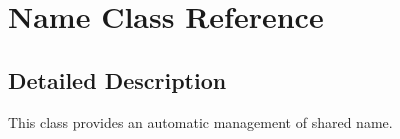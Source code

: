 \hypertarget{class_name}{\section{Name Class Reference}
\label{class_name}
}


\subsection{Detailed Description}
This class provides an automatic management of shared name. 